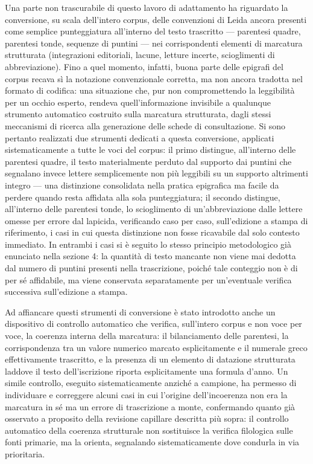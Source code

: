 \documentclass[11pt,a4paper]{article}
\begin{document}
Una parte non trascurabile di questo lavoro di adattamento ha riguardato
la conversione, su scala dell'intero corpus, delle convenzioni di Leida
ancora presenti come semplice punteggiatura all'interno del testo
trascritto --- parentesi quadre, parentesi tonde, sequenze di puntini ---
nei corrispondenti elementi di marcatura strutturata (integrazioni
editoriali, lacune, letture incerte, scioglimenti di abbreviazione). Fino
a quel momento, infatti, buona parte delle epigrafi del corpus recava sì
la notazione convenzionale corretta, ma non ancora tradotta nel formato
di codifica: una situazione che, pur non compromettendo la leggibilità
per un occhio esperto, rendeva quell'informazione invisibile a qualunque
strumento automatico costruito sulla marcatura strutturata, dagli stessi
meccanismi di ricerca alla generazione delle schede di consultazione. Si
sono pertanto realizzati due strumenti dedicati a questa conversione,
applicati sistematicamente a tutte le voci del corpus: il primo distingue,
all'interno delle parentesi quadre, il testo materialmente perduto dal
supporto dai puntini che segnalano invece lettere semplicemente non più
leggibili su un supporto altrimenti integro --- una distinzione consolidata
nella pratica epigrafica ma facile da perdere quando resta affidata alla
sola punteggiatura; il secondo distingue, all'interno delle parentesi
tonde, lo scioglimento di un'abbreviazione dalle lettere omesse per
errore dal lapicida, verificando caso per caso, sull'edizione a stampa di
riferimento, i casi in cui questa distinzione non fosse ricavabile dal
solo contesto immediato. In entrambi i casi si è seguito lo stesso
principio metodologico già enunciato nella sezione 4: la quantità di
testo mancante non viene mai dedotta dal numero di puntini presenti nella
trascrizione, poiché tale conteggio non è di per sé affidabile, ma viene
conservata separatamente per un'eventuale verifica successiva
sull'edizione a stampa.

Ad affiancare questi strumenti di conversione è stato introdotto anche un
dispositivo di controllo automatico che verifica, sull'intero corpus e
non voce per voce, la coerenza interna della marcatura: il bilanciamento
delle parentesi, la corrispondenza tra un valore numerico marcato
esplicitamente e il numerale greco effettivamente trascritto, e la
presenza di un elemento di datazione strutturata laddove il testo
dell'iscrizione riporta esplicitamente una formula d'anno. Un simile
controllo, eseguito sistematicamente anziché a campione, ha permesso di
individuare e correggere alcuni casi in cui l'origine dell'incoerenza non
era la marcatura in sé ma un errore di trascrizione a monte, confermando
quanto già osservato a proposito della revisione capillare descritta più
sopra: il controllo automatico della coerenza strutturale non sostituisce
la verifica filologica sulle fonti primarie, ma la orienta, segnalando
sistematicamente dove condurla in via prioritaria.
\end{document}
